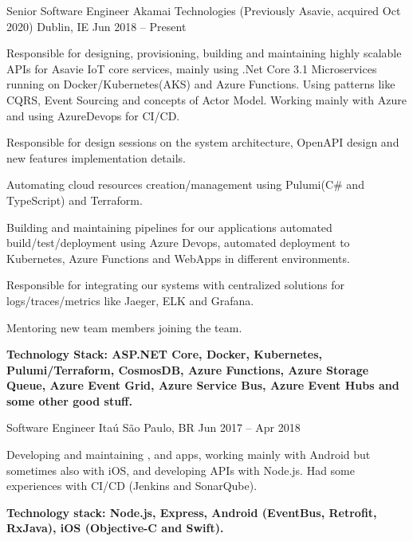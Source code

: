 \documentclass[]{awesome-cv}
\begin{document}
\begin{cventries}
	\cventry
	{Senior Software Engineer}
	{Akamai Technologies (Previously Asavie, acquired Oct 2020)}
	{Dublin, IE}
	{Jun 2018 – Present}
	{\begin{cvitems}
		\item {Responsible for designing, provisioning, building and maintaining highly scalable API\textquotesingle{}s for Asavie IoT core services, mainly using .Net Core 3.1 Microservices running on Docker/Kubernetes(AKS) and Azure Functions. Using patterns like CQRS, Event Sourcing and concepts of Actor Model. Working mainly with Azure and using AzureDevops for CI/CD.}
		\item {Responsible for design sessions on the system architecture, OpenAPI design and new features implementation details.}
		\item {Automating cloud resources creation/management using Pulumi(C\# and TypeScript) and Terraform.}
		\item {Building and maintaining pipelines for our applications automated build/test/deployment using Azure Devops, automated deployment to Kubernetes, Azure Functions and WebApps in different environments.}
		\item {Responsible for integrating our systems with centralized solutions for logs/traces/metrics like Jaeger, ELK and Grafana.}
		\item {Mentoring new team members joining the team.}
		\item \textbf{Technology Stack: ASP.NET Core, Docker, Kubernetes, Pulumi/Terraform, CosmosDB, Azure Functions, Azure Storage Queue, Azure Event Grid, Azure Service Bus, Azure Event Hubs and some other good stuff.}
		\end{cvitems}}
	\cventry
	{Software Engineer}
	{Itaú}
	{São Paulo, BR}
	{Jun 2017 – Apr 2018}
	{\begin{cvitems}
		\item {Developing and maintaining \href{https://play.google.com/store/apps/details?id=com.itau}{\color{darkblue}{Banco Itaú}}, \href{https://play.google.com/store/apps/details?id=com.itaucard.activity}{\color{darkblue}{ItaúCard}} and \href{https://play.google.com/store/apps/details?id=com.itau.iti}{\color{darkblue}{ITI}} apps, working mainly with Android but sometimes also with iOS, and developing API\textquotesingle{}s with Node.js. Had some experiences with CI/CD (Jenkins and SonarQube).}
		\item \textbf{Technology stack: Node.js, Express, Android (EventBus, Retrofit, RxJava), iOS (Objective-C and Swift).}

\end{cvitems}}
\end{cventries}
\end{document}
